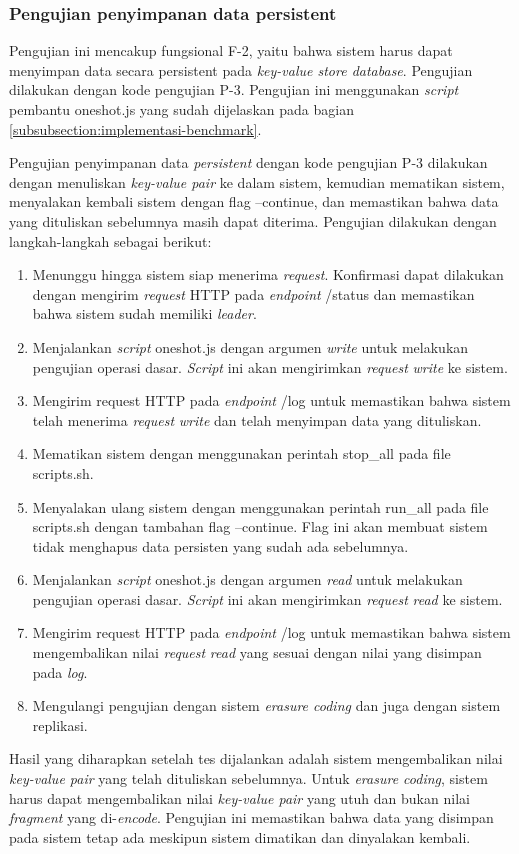 \subsubsection{Pengujian penyimpanan data persistent}
\label{subsubsection:pengujian-penyimpanan-data-persistent}

Pengujian ini mencakup fungsional F-2, yaitu bahwa sistem harus dapat menyimpan data secara persistent pada \textit{key-value store database}. Pengujian dilakukan dengan kode pengujian P-3. Pengujian ini menggunakan \textit{script} pembantu oneshot.js yang sudah dijelaskan pada bagian \ref{subsubsection:implementasi-benchmark}.

Pengujian penyimpanan data \textit{persistent} dengan kode pengujian P-3 dilakukan dengan menuliskan \textit{key-value pair} ke dalam sistem, kemudian mematikan sistem, menyalakan kembali sistem dengan flag --continue, dan memastikan bahwa data yang dituliskan sebelumnya masih dapat diterima. Pengujian dilakukan dengan langkah-langkah sebagai berikut:

\begin{enumerate}
  \item Menunggu hingga sistem siap menerima \textit{request}. Konfirmasi dapat dilakukan dengan mengirim \textit{request} HTTP pada \textit{endpoint} /status dan memastikan bahwa sistem sudah memiliki \textit{leader}.
  \item Menjalankan \textit{script} oneshot.js dengan argumen \textit{write} untuk melakukan pengujian operasi dasar. \textit{Script} ini akan mengirimkan \textit{request} \textit{write} ke sistem.
  \item Mengirim request HTTP pada \textit{endpoint} /log untuk memastikan bahwa sistem telah menerima \textit{request} \textit{write} dan telah menyimpan data yang dituliskan.
  \item Mematikan sistem dengan menggunakan perintah stop\_all pada file scripts.sh.
  \item Menyalakan ulang sistem dengan menggunakan perintah run\_all pada file scripts.sh dengan tambahan flag --continue. Flag ini akan membuat sistem tidak menghapus data persisten yang sudah ada sebelumnya.
  \item Menjalankan \textit{script} oneshot.js dengan argumen \textit{read} untuk melakukan pengujian operasi dasar. \textit{Script} ini akan mengirimkan \textit{request} \textit{read} ke sistem.
  \item Mengirim request HTTP pada \textit{endpoint} /log untuk memastikan bahwa sistem mengembalikan nilai \textit{request} \textit{read} yang sesuai dengan nilai yang disimpan pada \textit{log}.
  \item Mengulangi pengujian dengan sistem \textit{erasure coding} dan juga dengan sistem replikasi.
\end{enumerate}

Hasil yang diharapkan setelah tes dijalankan adalah sistem mengembalikan nilai \textit{key-value pair} yang telah dituliskan sebelumnya. Untuk \textit{erasure coding}, sistem harus dapat mengembalikan nilai \textit{key-value pair} yang utuh dan bukan nilai \textit{fragment} yang di-\textit{encode}. Pengujian ini memastikan bahwa data yang disimpan pada sistem tetap ada meskipun sistem dimatikan dan dinyalakan kembali.